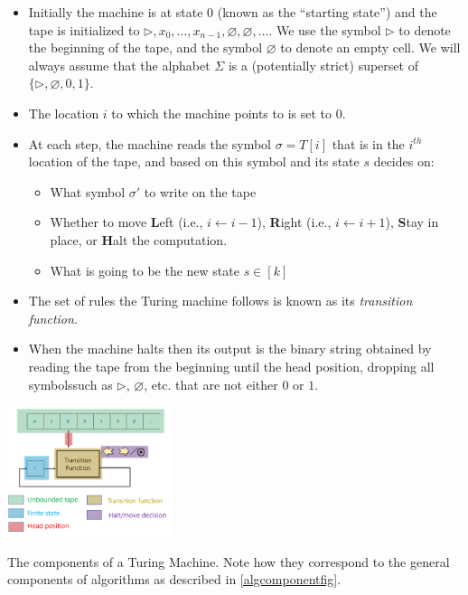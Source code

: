 \begin{itemize}
\item
  Initially the machine is at state \(0\) (known as the ``starting
  state'') and the tape is initialized to
  \(\triangleright,x_0,\ldots,x_{n-1},\varnothing,\varnothing,\ldots\).
  We use the symbol \(\triangleright\) to denote the beginning of the
  tape, and the symbol \(\varnothing\) to denote an empty cell. We will
  always assume that the alphabet \(\Sigma\) is a (potentially strict)
  superset of \(\{ \triangleright, \varnothing , 0 , 1 \}\).
\item
  The location \(i\) to which the machine points to is set to \(0\).
\item
  At each step, the machine reads the symbol \(\sigma = T[i]\) that is
  in the \(i^{th}\) location of the tape, and based on this symbol and
  its state \(s\) decides on:

  \begin{itemize}
  \tightlist
  \item
    What symbol \(\sigma'\) to write on the tape\\
  \item
    Whether to move \textbf{L}eft (i.e., \(i \leftarrow i-1\)),
    \textbf{R}ight (i.e., \(i \leftarrow i+1\)), \textbf{S}tay in place,
    or \textbf{H}alt the computation.
  \item
    What is going to be the new state \(s \in [k]\)
  \end{itemize}
\item
  The set of rules the Turing machine follows is known as its
  \emph{transition function}.
\item
  When the machine halts then its output is the binary string obtained
  by reading the tape from the beginning until the head position,
  dropping all symbolssuch as \(\triangleright\), \(\varnothing\), etc.
  that are not either \(0\) or \(1\).
\end{itemize}


\begin{marginfigure}
\centering
\includegraphics[width=\linewidth, height=1.5in, keepaspectratio]{../figure/turingmachinecomponents.png}
\caption{The components of a Turing Machine. Note how they correspond to
the general components of algorithms as described in
\cref{algcomponentfig}.}
\label{turingmachinecomponentsfig}
\end{marginfigure}

